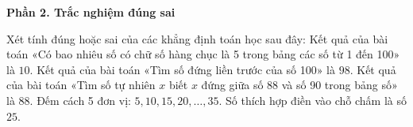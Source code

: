\textbf{Phần 2. Trắc nghiệm đúng sai}

\begin{ex} %
Xét tính đúng hoặc sai của các khẳng định toán học sau đây:
\choiceTF
{\True Kết quả của bài toán «Có bao nhiêu số có chữ số hàng chục là 5 trong bảng các số từ 1 đến 100» là $10$.}
{Kết quả của bài toán «Tìm số đứng liền trước của số 100» là $98$.}
{Kết quả của bài toán «Tìm số tự nhiên $x$ biết $x$ đứng giữa số 88 và số 90 trong bảng số» là $88$.}
{\True Đếm cách 5 đơn vị: $5, 10, 15, 20, \dots, 35$. Số thích hợp điền vào chỗ chấm là số $25$.}
\end{ex}

